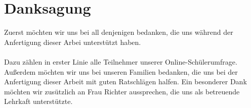 
\vspace*{5cm}
\section*{Danksagung}
\vspace{1.7cm}
Zuerst möchten wir uns bei all denjenigen bedanken, die uns während der Anfertigung dieser Arbei unterstützt haben. \\\\
Dazu zählen in erster Linie alle Teilnehmer unserer Online-Schülerumfrage. 
Außerdem möchten wir uns bei unseren Familien bedanken, die uns bei der Anfertigung dieser Arbeit mit guten Ratschlägen halfen.
Ein besonderer Dank möchten wir zusützlich an Frau Richter aussprechen, die uns als betreuende Lehrkaft unterstützte.
\newpage
